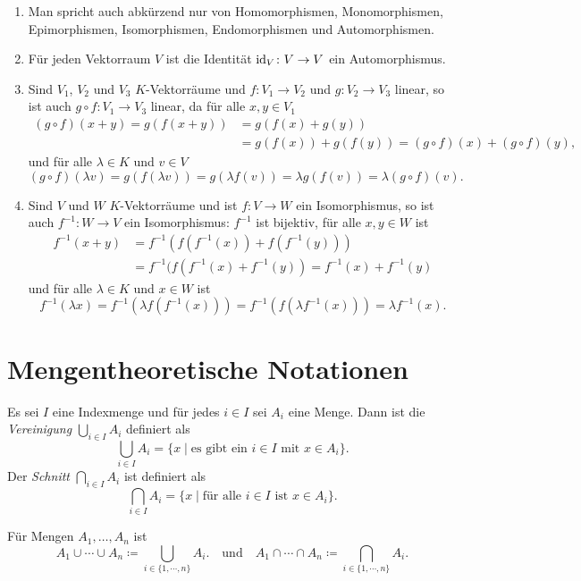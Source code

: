 \begin{bem}
 \begin{enumerate}[leftmargin=*]
  \item
   Man spricht auch abkürzend nur von Homomorphismen, Monomorphismen, Epimorphismen, Isomorphismen, Endomorphismen und Automorphismen.
  \item
   Für jeden Vektorraum $V$ ist die Identität $\mathrm{id}_V \colon V \to V$ ein Automorphismus.
  \item
   Sind $V_1$, $V_2$ und $V_3$ $K$-Vektorräume und $f \colon V_1 \to V_2$ und $g \colon V_2 \to V_3$ linear, so ist auch $g \circ f \colon V_1 \to V_3$ linear, da für alle $x,y \in V_1$
   \begin{align*}
    (g \circ f)(x+y)
    = g(f(x+y))
    &= g(f(x)+g(y)) \\
    &= g(f(x)) + g(f(y))
    = (g \circ f)(x) + (g \circ f)(y),
   \end{align*}
   und für alle $\lambda \in K$ und $v \in V$
   \[
    (g \circ f)(\lambda v)
    = g(f(\lambda v))
    = g(\lambda f(v))
    = \lambda g(f(v))
    = \lambda (g \circ f)(v).
   \]
  \item
   Sind $V$ und $W$ $K$-Vektorräume und ist $f \colon V \to W$ ein Isomorphismus, so ist auch $f^{-1} \colon W \to V$ ein Isomorphismus: $f^{-1}$ ist bijektiv, für alle $x,y \in W$ ist
   \begin{align*}
    f^{-1}(x+y)
    &= f^{-1}( f(f^{-1}(x)) + f(f^{-1}(y)) ) \\
    &= f^{-1}(f( f^{-1}(x) + f^{-1}(y) )
    = f^{-1}(x) + f^{-1}(y)
   \end{align*}
   und für alle $\lambda \in K$ und $x \in W$ ist
   \[
    f^{-1}(\lambda x)
    = f^{-1}(\lambda f(f^{-1}(x)) )
    = f^{-1}(f( \lambda f^{-1}(x)))
    = \lambda f^{-1}(x).
   \]
 \end{enumerate}
\end{bem}





\section{Mengentheoretische Notationen}


\begin{defi}
 Es sei $I$ eine Indexmenge und für jedes $i \in I$ sei $A_i$ eine Menge. Dann ist die \emph{Vereinigung} $\bigcup_{i \in I} A_i$ definiert als
 \[
  \bigcup_{i \in I} A_i
  = \{x \mid \text{es gibt ein $i \in I$ mit $x \in A_i$}\}.
 \]
 Der \emph{Schnitt} $\bigcap_{i \in I} A_i$ ist definiert als
 \[
  \bigcap_{i \in I} A_i
  = \{x \mid \text{für alle $i \in I$ ist $x \in A_i$}\}.
 \]
 
 Für Mengen $A_1, \dotsc, A_n$ ist
 \[
  A_1 \cup \dotsb \cup A_n \coloneqq \bigcup_{i \in \{1, \dotsb, n\}} A_i.
  \quad\text{und}\quad
  A_1 \cap \dotsb \cap A_n \coloneqq \bigcap_{i \in \{1, \dotsb, n\}} A_i.
 \]
\end{defi}


